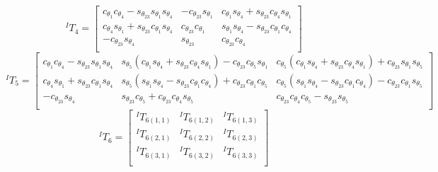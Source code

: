 \[
^IT_4 =
\begin{bmatrix}
c_{\theta_1}c_{\theta_4} - s_{\theta_{23}}s_{\theta_1}s_{\theta_4}& -c_{\theta_{23}}s_{\theta_1}& c_{\theta_1}s_{\theta_4} + s_{\theta_{23}}c_{\theta_4}s_{\theta_1}\\
c_{\theta_4}s_{\theta_1} + s_{\theta_{23}}c_{\theta_1}s_{\theta_4}&  c_{\theta_{23}}c_{\theta_1}& s_{\theta_1}s_{\theta_4} - s_{\theta_{23}}c_{\theta_1}c_{\theta_4}\\
-c_{\theta_{23}}s_{\theta_4}&              s_{\theta_{23}}&                                       c_{\theta_{23}}c_{\theta_4}\\
\end{bmatrix}
\]
\[
^IT_5 =
\begin{bmatrix}
c_{\theta_1}c_{\theta_4} - s_{\theta_{23}}s_{\theta_1}s_{\theta_4}& s_{\theta_5}(c_{\theta_1}s_{\theta_4} + s_{\theta_{23}}c_{\theta_4}s_{\theta_1}) - c_{\theta_{23}}c_{\theta_5}s_{\theta_1}& c_{\theta_5}(c_{\theta_1}s_{\theta_4} +
 s_{\theta_{23}}c_{\theta_4}s_{\theta_1}) + c_{\theta_{23}}s_{\theta_1}s_{\theta_5}\\
c_{\theta_4}s_{\theta_1} + s_{\theta_{23}}c_{\theta_1}s_{\theta_4}& s_{\theta_5}(s_{\theta_1}s_{\theta_4} - s_{\theta_{23}}c_{\theta_1}c_{\theta_4}) + c_{\theta_{23}}c_{\theta_1}c_{\theta_5}& c_{\theta_5}(s_{\theta_1}s_{\theta_4} - s_{\theta_{23}}c_{\theta_1}c_{\theta_4}) - c_{\theta_{23}}c_{\theta_1}s_{\theta_5}\\
-c_{\theta_{23}}s_{\theta_4}&                                                     s_{\theta_{23}}c_{\theta_5} + c_{\theta_{23}}c_{\theta_4}s_{\theta_5}&                                                     c_{\theta_{23}}c_{\theta_4}c_{\theta_5} - s_{\theta_{23}}s_{\theta_5}\\
\end{bmatrix}
\]
\[
^IT_6 =
\begin{bmatrix}
  ^IT_{6(1,1)} & ^IT_{6(1,2)} & ^IT_{6(1,3)}\\
  ^IT_{6(2,1)} & ^IT_{6(2,2)} & ^IT_{6(2,3)}\\
  ^IT_{6(3,1)} & ^IT_{6(3,2)} & ^IT_{6(3,3)}\\
\end{bmatrix}
\]
